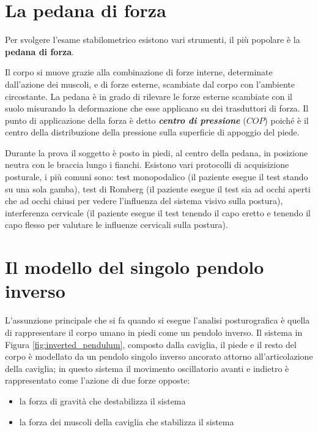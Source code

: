 \section{La pedana di forza}
Per svolgere l'esame stabilometrico esistono vari strumenti, il più popolare è la {\bfseries pedana di forza}.

Il corpo si muove grazie alla combinazione di forze interne, determinate dall'azione dei muscoli, e di forze esterne, scambiate dal corpo con l'ambiente circostante. La pedana 
è in grado di rilevare le forze esterne scambiate con il suolo misurando la deformazione che esse applicano su dei trasduttori di forza. Il punto di applicazione della forza è detto {\bfseries\itshape centro di pressione} ($COP$) poiché è il centro della distribuzione della pressione sulla superficie di appoggio del piede.

Durante la prova il soggetto è posto in piedi, al centro della pedana, in posizione neutra con le braccia lungo i fianchi. Esistono vari protocolli di acquisizione posturale, i più comuni sono: test monopodalico (il paziente esegue il test stando su una sola gamba), test di Romberg (il paziente esegue il test sia ad occhi aperti che ad occhi chiusi per vedere l'influenza del sistema visivo sulla postura), interferenza cervicale (il paziente esegue il test tenendo il capo eretto e tenendo il capo flesso per valutare le influenze cervicali sulla postura).

\section{Il modello del singolo pendolo inverso}
L'assunzione principale che si fa quando si esegue l'analisi posturografica è quella di rappresentare il corpo umano in piedi come un pendolo inverso. Il sistema in Figura \ref{fig:inverted_pendulum}, composto dalla caviglia, il piede e il resto del corpo è modellato da un pendolo singolo inverso ancorato attorno all'articolazione della caviglia; in questo sistema il movimento oscillatorio avanti e indietro è rappresentato come l'azione di due forze opposte:
\begin{itemize}
    \item la forza di gravità che destabilizza il sistema
    \item la forza dei muscoli della caviglia che stabilizza il sistema
\end{itemize}

